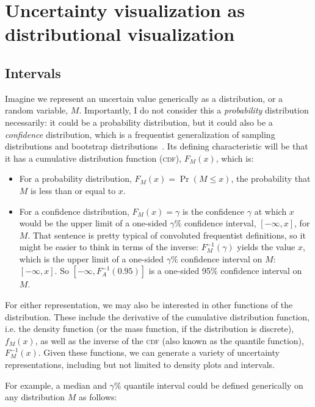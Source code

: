 \documentclass[journal]{vgtc}                     %
\begin{document}
\section{Uncertainty visualization as\\distributional visualization}

\subsection{Intervals}

Imagine we represent an uncertain value generically as a distribution, or a random variable, $M$. Importantly, I do not consider this a \textit{probability} distribution necessarily: it could be a probability distribution, but it could also be a \textit{confidence} distribution, which is a frequentist generalization of sampling distributions and bootstrap distributions~\cite{xie2013confidence}. Its defining characteristic will be that it has a cumulative distribution function (\textsc{cdf}), $F_M(x)$, which is:
\begin{itemize}
    \item For a probability distribution, $F_M(x) = \Pr(M \le x)$, the probability that $M$ is less than or equal to $x$.
    \item   For a confidence distribution, $F_M(x) = \gamma$  is the confidence $\gamma$ at which $x$ would be the upper limit of a one-sided $\gamma\%$ confidence interval, $[-\infty, x]$, for $M$. That sentence is pretty typical of convoluted frequentist definitions, so it might be easier to think in terms of the inverse: $F_M^{-1}(\gamma)$ yields the value $x$, which is the upper limit of a one-sided $\gamma\%$ confidence interval on $M$: $[-\infty,x]$. So $[-\infty, F_A^{-1}(0.95)]$ is a one-sided 95\% confidence interval on $M$.
\end{itemize}

For either representation, we may also be interested in other functions of the distribution. These include the derivative of the cumulative distribution function, i.e. the density function (or the mass function, if the distribution is discrete), $f_M(x)$, as well as the inverse of the \textsc{cdf} (also known as the quantile function), $F_M^{-1}(x)$. Given these functions, we can generate a variety of uncertainty representations, including but not limited to density plots and intervals.

For example, a median and $\gamma\%$ quantile interval could be defined generically on any distribution $M$ as follows:
\end{document}
